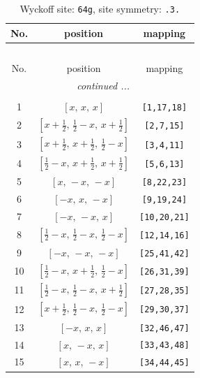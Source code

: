 \documentclass[fleqn,8pt]{jsarticle}
\begin{document}
\begin{longtable}{ccc}
\caption{Wyckoff site: {\tt 64g}, site symmetry: {\tt .3.}}
 \\
 \hline \hline
No. & position & mapping \\ \hline \endfirsthead

\multicolumn{2}{l}{\tablename\ \thetable{}} \\
 \hline \hline
No. & position & mapping \\ \hline \endhead

 \hline \hline
\multicolumn{2}{r}{\footnotesize\it continued ...} \\ \endfoot

 \hline \hline
\multicolumn{2}{r}{} \\ \endlastfoot

1 & $\left[ x,\, x,\, x \right]$ & {\tt [1,17,18]} \\ \hline
2 & $\left[ x + \frac{1}{2},\, \frac{1}{2} - x,\, x + \frac{1}{2} \right]$ & {\tt [2,7,15]} \\ \hline
3 & $\left[ x + \frac{1}{2},\, x + \frac{1}{2},\, \frac{1}{2} - x \right]$ & {\tt [3,4,11]} \\ \hline
4 & $\left[ \frac{1}{2} - x,\, x + \frac{1}{2},\, x + \frac{1}{2} \right]$ & {\tt [5,6,13]} \\ \hline
5 & $\left[ x,\, - x,\, - x \right]$ & {\tt [8,22,23]} \\ \hline
6 & $\left[ - x,\, x,\, - x \right]$ & {\tt [9,19,24]} \\ \hline
7 & $\left[ - x,\, - x,\, x \right]$ & {\tt [10,20,21]} \\ \hline
8 & $\left[ \frac{1}{2} - x,\, \frac{1}{2} - x,\, \frac{1}{2} - x \right]$ & {\tt [12,14,16]} \\ \hline
9 & $\left[ - x,\, - x,\, - x \right]$ & {\tt [25,41,42]} \\ \hline
10 & $\left[ \frac{1}{2} - x,\, x + \frac{1}{2},\, \frac{1}{2} - x \right]$ & {\tt [26,31,39]} \\ \hline
11 & $\left[ \frac{1}{2} - x,\, \frac{1}{2} - x,\, x + \frac{1}{2} \right]$ & {\tt [27,28,35]} \\ \hline
12 & $\left[ x + \frac{1}{2},\, \frac{1}{2} - x,\, \frac{1}{2} - x \right]$ & {\tt [29,30,37]} \\ \hline
13 & $\left[ - x,\, x,\, x \right]$ & {\tt [32,46,47]} \\ \hline
14 & $\left[ x,\, - x,\, x \right]$ & {\tt [33,43,48]} \\ \hline
15 & $\left[ x,\, x,\, - x \right]$ & {\tt [34,44,45]} \\ \hline

\end{longtable}
\end{document}
